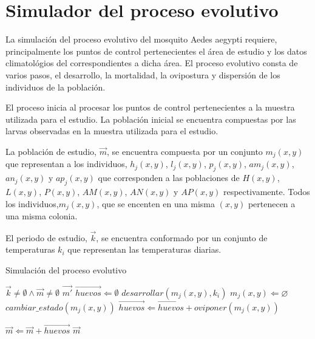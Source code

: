 \section{Simulador del proceso evolutivo}
\label{sec:cap4-simulador-proceso-evolutivo}
La simulación del proceso evolutivo del mosquito Aedes aegypti requiere, principalmente los
puntos de control pertenecientes el área de estudio y los datos climatológios del correspondientes
a dicha área. El proceso evolutivo consta de varios pasos, el desarrollo, la mortalidad,
la ovipostura y dispersión de los individuos de la población.

El proceso inicia al procesar los puntos de control pertenecientes a la muestra utilizada para el
estudio. La población inicial se encuentra compuestas por las larvas observadas en la muestra
utilizada para el estudio.

La población de estudio, $\vec{m}$, se encuentra compuesta por un conjunto $m_{j}(x,y)$ que representan a los individuos, $h_{j}(x,y)$, $l_{j}(x,y)$, $p_{j}(x,y)$, $am_{j}(x,y)$,
$an_{j}(x,y)$ y $ap_{j}(x,y)$ que corresponden a las poblaciones de $H(x,y)$, $L(x,y)$, $P(x,y)$,
$AM(x,y)$, $AN(x,y)$ y $AP(x,y)$ respectivamente. Todos los individuos,$m_{j}(x,y)$, que se
encenten en una misma $(x, y)$ pertenecen a una misma colonia.

El periodo de estudio, $\vec{k}$, se encuentra conformado por un conjunto de temperaturas $k_{i}$
que representan las temperaturas diarias.

\begin{algorithm}
\caption{Simulación del proceso evolutivo}
\label{alg:simulador-evolutivo}
\begin{algorithmic}[1]
    \REQUIRE $\vec{k}\neq \emptyset \land \vec{m} \neq \emptyset$
    \ENSURE $\vec{m'}$
        \STATE $\vec{huevos} \Leftarrow \emptyset$
            \STATE $desarrollar(m_{j}(x, y), k_{i})$
                \STATE {}
                \STATE $m_{j}(x, y) \Leftarrow \varnothing $
                \STATE $ cambiar\_estado(m_{j}(x, y)) $
                \STATE $\vec{huevos} \Leftarrow \vec{huevos} + oviponer(m_{j}(x, y))$
            \ENDIF
        \ENDFOR

            \STATE {}
            \STATE $\vec{m} \Leftarrow  \vec{m} + \vec{huevos}$
        \ENDIF
    \ENDFOR
    \RETURN $\vec{m}$
\end{algorithmic}
\end{algorithm}

